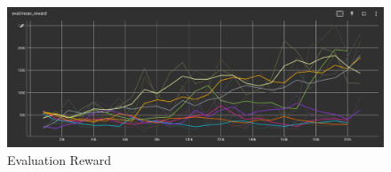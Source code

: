\begin{figure}[ht]
	\centering
	\includegraphics[width=1\linewidth]{Results/A2CvPPO/eval_reward.png}
	\caption{ Evaluation Reward}
	\label{f:g18}	
\end{figure}


